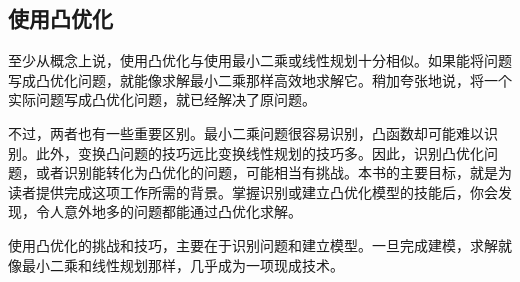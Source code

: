 \subsection{使用凸优化}
至少从概念上说，使用凸优化与使用最小二乘或线性规划十分相似。如果能将问题写成凸优化问题，就能像求解最小二乘那样高效地求解它。稍加夸张地说，将一个实际问题写成凸优化问题，就已经解决了原问题。

不过，两者也有一些重要区别。最小二乘问题很容易识别，凸函数却可能难以识别。此外，变换凸问题的技巧远比变换线性规划的技巧多。因此，识别凸优化问题，或者识别能转化为凸优化的问题，可能相当有挑战。本书的主要目标，就是为读者提供完成这项工作所需的背景。掌握识别或建立凸优化模型的技能后，你会发现，令人意外地多的问题都能通过凸优化求解。

使用凸优化的挑战和技巧，主要在于识别问题和建立模型。一旦完成建模，求解就像最小二乘和线性规划那样，几乎成为一项现成技术。
